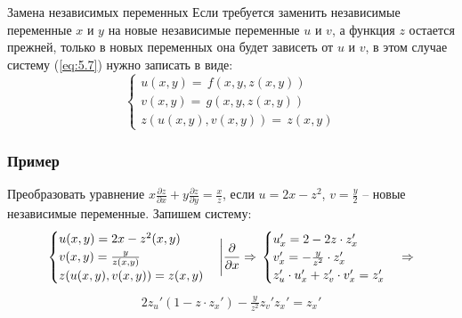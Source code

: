 \begin{tbox}{Замена независимых переменных}
	Если требуется заменить независимые переменные $x$ и $y$ на новые независимые переменные $u$ и $v$, а функция $z$ остается прежней, только в новых переменных она будет зависеть от $u$ и $v$, в этом случае систему (\ref{eq:5.7}) нужно записать в виде:
	\begin{equation} \label{eq:5.10}
		\begin{cases}
			u(x,y) = \, f(x,y,z(x,y))\\
			v(x,y) = \, g(x,y,z(x,y))\\
			z(u(x,y), v(x,y)) = \, z(x,y)
		\end{cases}
	\end{equation}
\end{tbox}
\newpage
\subsubsection*{Пример}
Преобразовать уравнение $x \frac{\partial z}{\partial x} + y \frac{\partial z}{\partial y} = \frac{x}{z}$, если $u = 2x - z^2$, $v = \frac{y}{2}$ -- новые независимые переменные. Запишем систему:
\begin{equation*}
	\begin{cases}
		u(x,y) = 2x - z^2(x,y)\\
		v(x,y) = \frac{y}{z(x,y)}\\
		z(u(x,y), v(x,y)) = z(x,y)
	\end{cases}
	\Bigg| \frac{\partial}{\partial x} \Rightarrow\\
	\begin{cases}
		u_x' = 2 - 2z \cdot z_x'\\
		v_x' = -\frac{y}{z^2} \cdot z_x'\\
		z_u' \cdot u_x' + z_v' \cdot v_x' = z_x'
	\end{cases} \Rightarrow
\end{equation*}
\begin{align*}
	2z_u'(1 - z \cdot z_x') - \frac{y}{z^2} z_v' z_x' = z_x'
\end{align*}

